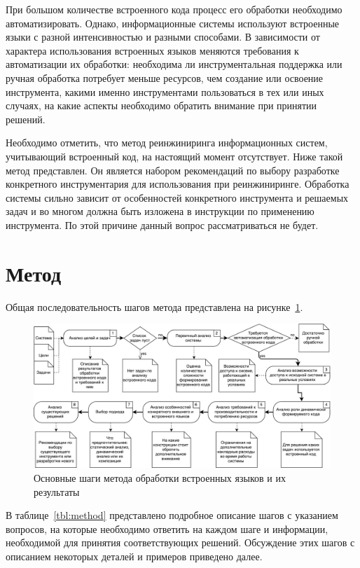 При большом количестве встроенного кода процесс его обработки необходимо автоматизировать. Однако, информационные системы используют встроенные языки с разной интенсивностью и разными способами. В зависимости от характера использования встроенных языков меняются требования к автоматизации их обработки: необходима ли инструментальная поддержка или ручная обработка потребует меньше ресурсов, чем создание или освоение инструмента, какими именно инструментами пользоваться в тех или иных случаях, на какие аспекты необходимо обратить внимание при принятии решений.

Необходимо отметить, что метод реинжиниринга информационных систем, учитывающий встроенный код, на настоящий момент отсутствует. Ниже такой метод представлен. Он является набором рекомендаций по выбору разработке конкретного инструментария для использования при реинжиниринге. Обработка системы сильно зависит от особенностей конкретного инструмента и решаемых задач и во многом должна быть изложена в инструкции по применению инструмента. По этой причине данный вопрос рассматриваться не будет.


\section{Метод}

Общая последовательность шагов метода представлена на рисунке~\ref{fig:method}.

\begin{figure}[ht!]
\begin{center}
\includegraphics[width=.95\textwidth]{pics/ReengMethodSteps}
\caption{Основные шаги метода обработки встроенных языков и их результаты}
\label{fig:method} 
\end{center}
\end{figure}

В таблице~\ref{tbl:method} представлено подробное описание шагов с указанием вопросов, на которые необходимо ответить на каждом шаге и информации, необходимой для принятия соответствующих решений. Обсуждение этих шагов с описанием некоторых деталей и примеров приведено далее.

